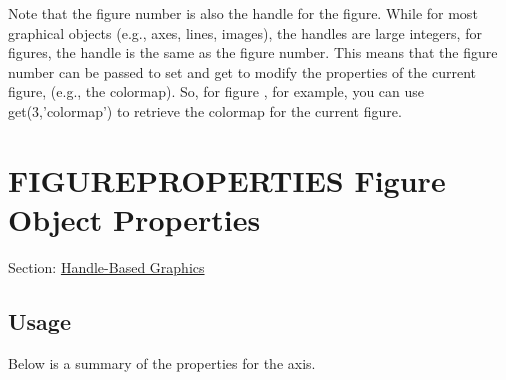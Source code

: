Note that the figure number is also the handle for the figure. While for most graphical objects (e.\-g., axes, lines, images), the handles are large integers, for figures, the handle is the same as the figure number. This means that the figure number can be passed to {\ttfamily set} and {\ttfamily get} to modify the properties of the current figure, (e.\-g., the colormap). So, for figure {}, for example, you can use {\ttfamily get(3,'colormap')} to retrieve the colormap for the current figure. \hypertarget{handle_figureproperties}{}\section{F\-I\-G\-U\-R\-E\-P\-R\-O\-P\-E\-R\-T\-I\-E\-S Figure Object Properties}\label{handle_figureproperties}
Section\-: \hyperlink{sec_handle}{Handle-\/\-Based Graphics} \hypertarget{vtkwidgets_vtkxyplotwidget_Usage}{}\subsection{Usage}\label{vtkwidgets_vtkxyplotwidget_Usage}
Below is a summary of the properties for the axis. 
